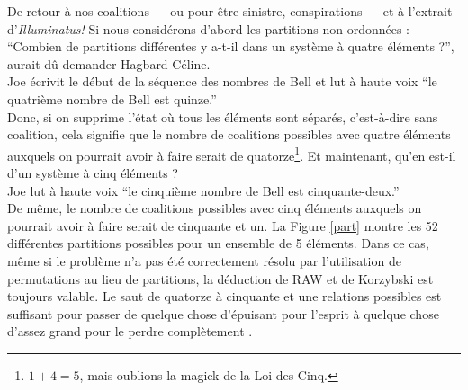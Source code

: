 De retour à nos coalitions --- ou pour être sinistre, conspirations --- et à l'extrait d'\textit{Illuminatus!} Si nous considérons d'abord les partitions non ordonnées : ``Combien de partitions différentes y a-t-il dans un système à quatre éléments ?'', aurait dû demander Hagbard Céline.\\
Joe écrivit le début de la séquence des nombres de Bell et lut à haute voix ``le quatrième nombre de Bell est quinze.''\\
Donc, si on supprime l'état où tous les éléments sont séparés, c'est-à-dire sans coalition, cela signifie que le nombre de coalitions possibles avec quatre éléments auxquels on pourrait avoir à faire serait de quatorze\footnote{$1+4=5$, mais oublions la magick de la Loi des Cinq\cite{Malaclypse1963}.}. Et maintenant, qu'en est-il d'un système à cinq éléments ?\\
Joe lut à haute voix ``le cinquième nombre de Bell est cinquante-deux.''\\
De même, le nombre de coalitions possibles avec cinq éléments auxquels on pourrait avoir à faire serait de cinquante et un. La Figure \ref{part} montre les 52 différentes partitions possibles pour un ensemble de 5 éléments.
Dans ce cas, même si le problème n'a pas été correctement résolu par l'utilisation de permutations au lieu de partitions, la déduction de RAW et de Korzybski est toujours valable. 
Le saut de quatorze à cinquante et une relations possibles est suffisant pour passer de quelque chose d'épuisant pour l'esprit à quelque chose d'assez grand pour le perdre complètement \cite{Kelly1955, Korzybski1933}. \\

